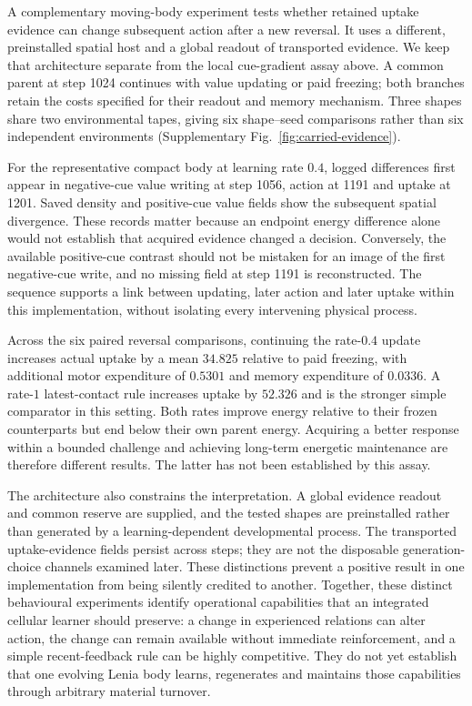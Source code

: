 A complementary moving-body experiment tests whether retained uptake evidence can change subsequent action after a new reversal. It uses a different, preinstalled spatial host and a global readout of transported evidence. We keep that architecture separate from the local cue-gradient assay above. A common parent at step 1024 continues with value updating or paid freezing; both branches retain the costs specified for their readout and memory mechanism. Three shapes share two environmental tapes, giving six shape--seed comparisons rather than six independent environments (Supplementary Fig.~\ref{fig:carried-evidence}).

For the representative compact body at learning rate $0.4$, logged differences first appear in negative-cue value writing at step 1056, action at 1191 and uptake at 1201. Saved density and positive-cue value fields show the subsequent spatial divergence. These records matter because an endpoint energy difference alone would not establish that acquired evidence changed a decision. Conversely, the available positive-cue contrast should not be mistaken for an image of the first negative-cue write, and no missing field at step 1191 is reconstructed. The sequence supports a link between updating, later action and later uptake within this implementation, without isolating every intervening physical process.

Across the six paired reversal comparisons, continuing the rate-$0.4$ update increases actual uptake by a mean $34.825$ relative to paid freezing, with additional motor expenditure of $0.5301$ and memory expenditure of $0.0336$. A rate-$1$ latest-contact rule increases uptake by $52.326$ and is the stronger simple comparator in this setting. Both rates improve energy relative to their frozen counterparts but end below their own parent energy. Acquiring a better response within a bounded challenge and achieving long-term energetic maintenance are therefore different results. The latter has not been established by this assay.


The architecture also constrains the interpretation. A global evidence readout and common reserve are supplied, and the tested shapes are preinstalled rather than generated by a learning-dependent developmental process. The transported uptake-evidence fields persist across steps; they are not the disposable generation-choice channels examined later. These distinctions prevent a positive result in one implementation from being silently credited to another. Together, these distinct behavioural experiments identify operational capabilities that an integrated cellular learner should preserve: a change in experienced relations can alter action, the change can remain available without immediate reinforcement, and a simple recent-feedback rule can be highly competitive. They do not yet establish that one evolving Lenia body learns, regenerates and maintains those capabilities through arbitrary material turnover.

